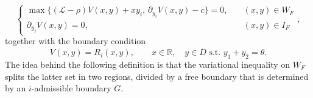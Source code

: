 \documentclass[10pt]{article}
\numberwithin{equation}{section}
\theoremstyle{plain}
\numberwithin{theorem}{section}
\theoremstyle{definition}
\def \R {\mathbb{R}}
\def \p {\partial}
\newcommand{\<}{\langle}
\renewcommand{\>}{\rangle}
\renewcommand{\(}{\left(}
\renewcommand{\)}{\right)}
\def \R  {{\mathbb {R}}}
\def \p {{\partial}}
\def \R {{\mathbb {R}}}
\def\cL{{\mathcal L}}
\begin{document}
{{{\begin{equation}\label{HJB_quat}
\begin{cases}
\max\{(\cL-\rho)V(x,y)+xy_i,\, \p_{y_i}V(x,y)-c\}=0, &\quad(x,y)\in W_F \\
\p_{y_j}V(x,y) = 0, &\quad (x,y)\in I_F
\end{cases}, 
\end{equation}
together with the boundary condition  
\begin{equation}\label{eq:terminal_cond_bis}
V(x,y)=R_i(x,y), \qquad {x\in\R, \quad y\in \overline{D} \text{ s.t. } y_1 + y_2 = \theta.} %
\end{equation}
The idea behind the following definition is that the variational inequality on $W_F$ splits the latter set in two regions, divided by a free boundary that is determined by an $i$-admissible boundary $G$.

}}}
\end{document}

